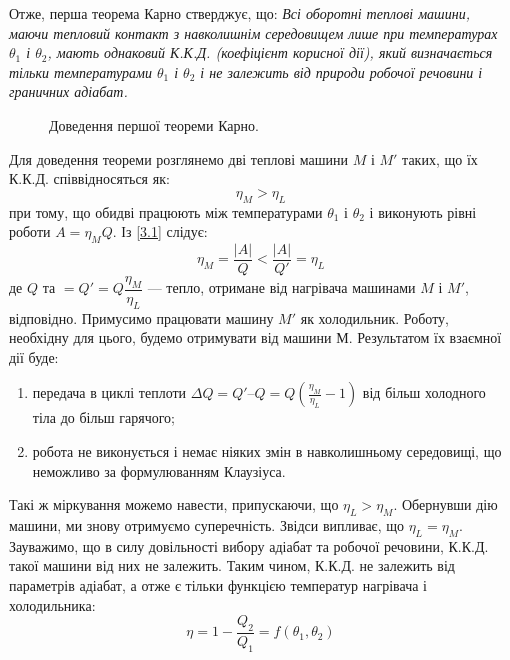 Отже, перша теорема Карно стверджує, що: \emph{Всі оборотні теплові машини, маючи тепловий контакт з навколишнім середовищем лише при температурах $\theta_1$ і $\theta_2$, мають однаковий К.К.Д. (коефіцієнт корисної дії), який визначається тільки температурами $\theta_1$ і $\theta_2$ і не залежить від природи робочої речовини і граничних адіабат.}


\begin{figure}[h!]
	\centering
    
	\caption{Доведення першої теореми Карно.}
	\label{pic:3.2}
\end{figure}

Для доведення теореми розглянемо дві теплові машини $M$ і $M'$ таких, що їх К.К.Д. співвідносяться як:
\begin{equation}\label{3.1}
	\eta_M>\eta_L
\end{equation}
при тому, що обидві працюють між температурами $\theta_1$ і $\theta_2$ і виконують рівні роботи
$A=\eta_M Q$. Із \eqref{3.1} слідує:
\begin{equation}\label{3.2}
	\eta_M = \frac{|A|}{Q} <  \frac{|A|}{Q'} = \eta_L
\end{equation}
де $Q$ та $=Q'= Q\dfrac{\eta_M}{\eta_L}$  --- тепло, отримане від нагрівача машинами $M$ і $M'$,
відповідно. Примусимо працювати машину $M'$ як холодильник. Роботу, необхідну для цього, будемо
отримувати від машини М. Результатом їх взаємної дії буде:
\begin{enumerate}
	\item [a)] передача в циклі теплоти $\Delta Q = Q' – Q = Q\left( \frac{\eta_M}{\eta_L} - 1 \right)
	      $ від більш холодного тіла до більш гарячого;
	\item [б)] робота не виконується і немає ніяких змін в навколишньому середовищі, що неможливо за формулюванням Клаузіуса.
\end{enumerate}

Такі ж міркування можемо навести, припускаючи, що $\eta_L>\eta_M$. Обернувши дію машини, ми знову
отримуємо суперечність. Звідси випливає, що $\eta_L = \eta_M$. Зауважимо, що в силу довільності вибору
адіабат та робочої речовини, К.К.Д. такої машини від них не залежить. Таким чином, К.К.Д. не залежить
від параметрів адіабат, а отже є тільки функцією температур нагрівача і холодильника:
\begin{equation}\label{3.3}
	\eta = 1 - \dfrac{Q_2}{Q_1} = f(\theta_1, \theta_2)
\end{equation}

